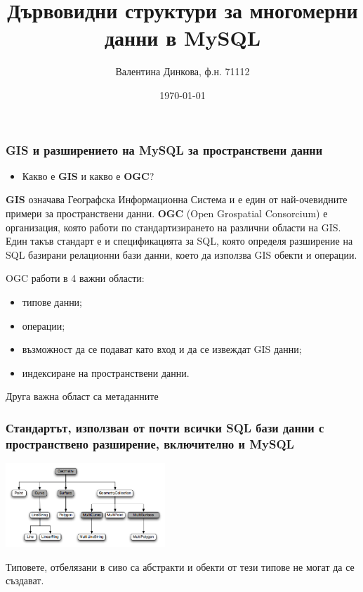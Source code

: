 \documentclass{beamer}
\title[Дървовидни структури за многомерни данни в MySQL]{Дървовидни структури за многомерни данни в MySQL}
\author{Валентина Динкова, ф.н. 71112}
\institute{ФМИ}
\date{\today}
\begin{document}
\begin{frame}
  \titlepage
\end{frame}

\begin{frame}
  \frametitle{GIS и разширението на MySQL за пространствени данни}
\begin{itemize}
 \item Какво е \textbf{GIS} и какво е \textbf{OGC}?
\end{itemize}
\textbf{GIS} означава Географска Информационна Система и е един от най-очевидните примери за пространствени данни.
\newline
\newline
\textbf{OGC} (Open Grospatial Consorcium) е организация, която работи по стандартизирането на различни области на GIS.
Един такъв стандарт е и спецификацията за SQL, която определя разширение на SQL базирани релационни бази данни, което да използва GIS обекти и операции.
\end{frame}

\begin{frame}
 OGC работи в 4 важни области:
\begin{itemize}
 \item типове данни;
 \item операции;
 \item възможност да се подават като вход и да се извеждат GIS данни;
 \item индексиране на пространствени данни.
\end{itemize}
Друга важна област са метаданните
\end{frame}

\begin{frame}
\frametitle{Стандартът, използван от почти всички SQL бази данни с пространствено разширение, включително и MySQL}
\begin{center}
\includegraphics[width=60mm]{gis-datatypes.png}\end{center}
Типовете, отбелязани в сиво са абстракти и обекти от тези типове не могат да се създават.
\end{frame}
\end{document}
